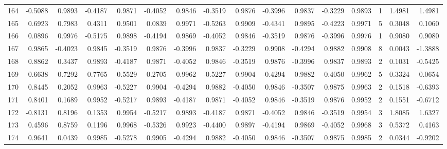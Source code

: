 \begin{tabular}{lrrrrrrrrrrrrrrr}
164 &     -0.5088 &  0.9893 & -0.4187 &  0.9871 & -0.4052 &  0.9846 & -0.3519 &  0.9876 & -0.3996 &  0.9837 &  -0.3229 &     0.9893 &      1 &                    1.4981 &                     1.4981 \\
165 &      0.6923 &  0.7983 &  0.4311 &  0.9501 &  0.0839 &  0.9971 & -0.5263 &  0.9909 & -0.4341 &  0.9895 &  -0.4223 &     0.9971 &      5 &                    0.3048 &                     0.1060 \\
166 &      0.0896 &  0.9976 & -0.5175 &  0.9898 & -0.4194 &  0.9869 & -0.4052 &  0.9846 & -0.3519 &  0.9876 &  -0.3996 &     0.9976 &      1 &                    0.9080 &                     0.9080 \\
167 &      0.9865 & -0.4023 &  0.9845 & -0.3519 &  0.9876 & -0.3996 &  0.9837 & -0.3229 &  0.9908 & -0.4294 &   0.9882 &     0.9908 &      8 &                    0.0043 &                    -1.3888 \\
168 &      0.8862 &  0.3437 &  0.9893 & -0.4187 &  0.9871 & -0.4052 &  0.9846 & -0.3519 &  0.9876 & -0.3996 &   0.9837 &     0.9893 &      2 &                    0.1031 &                    -0.5425 \\
169 &      0.6638 &  0.7292 &  0.7765 &  0.5529 &  0.2705 &  0.9962 & -0.5227 &  0.9904 & -0.4294 &  0.9882 &  -0.4050 &     0.9962 &      5 &                    0.3324 &                     0.0654 \\
170 &      0.8445 &  0.2052 &  0.9963 & -0.5227 &  0.9904 & -0.4294 &  0.9882 & -0.4050 &  0.9846 & -0.3507 &   0.9875 &     0.9963 &      2 &                    0.1518 &                    -0.6393 \\
171 &      0.8401 &  0.1689 &  0.9952 & -0.5217 &  0.9893 & -0.4187 &  0.9871 & -0.4052 &  0.9846 & -0.3519 &   0.9876 &     0.9952 &      2 &                    0.1551 &                    -0.6712 \\
172 &     -0.8131 &  0.8196 &  0.1353 &  0.9954 & -0.5217 &  0.9893 & -0.4187 &  0.9871 & -0.4052 &  0.9846 &  -0.3519 &     0.9954 &      3 &                    1.8085 &                     1.6327 \\
173 &      0.4596 &  0.8759 &  0.1196 &  0.9968 & -0.5326 &  0.9923 & -0.4400 &  0.9897 & -0.4194 &  0.9869 &  -0.4052 &     0.9968 &      3 &                    0.5372 &                     0.4163 \\
174 &      0.9641 &  0.0439 &  0.9985 & -0.5278 &  0.9905 & -0.4294 &  0.9882 & -0.4050 &  0.9846 & -0.3507 &   0.9875 &     0.9985 &      2 &                    0.0344 &                    -0.9202 \\

\end{tabular}
